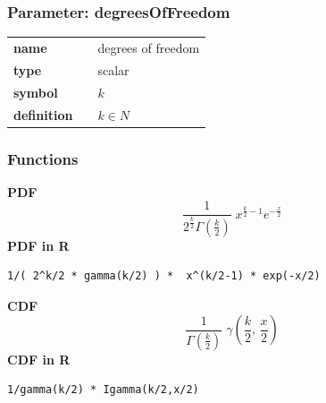 \subsubsection*{Parameter: degreesOfFreedom}

\noindent\begin{tabular}{p{2cm}cl}
\textbf{name} & & degrees of freedom \\
\textbf{type} & & scalar \\
\textbf{symbol} & & $k$  \\
\textbf{definition} & & $k \in N$
\end{tabular}
\subsubsection*{Functions}

\smallskip \noindent \hspace{.2cm} \textbf{PDF} 
\begin{equation*}\frac{1}{2^{\frac{k}{2}}\Gamma\left(\frac{k}{2}\right)}\; x^{\frac{k}{2}-1} e^{-\frac{x}{2}}\end{equation*}
\smallskip \noindent \hspace{.2cm} \textbf{PDF in R}  
\begin{verbatim}1/( 2^k/2 * gamma(k/2) ) *  x^(k/2-1) * exp(-x/2)\end{verbatim}
\smallskip \noindent \hspace{.2cm} \textbf{CDF} 
\begin{equation*}\frac{1}{\Gamma\left(\frac{k}{2}\right)}\; \gamma\left(\frac{k}{2},\,\frac{x}{2}\right)\end{equation*}
\smallskip \noindent \hspace{.2cm} \textbf{CDF in R} 
\begin{verbatim}1/gamma(k/2) * Igamma(k/2,x/2)\end{verbatim}
\smallskip
